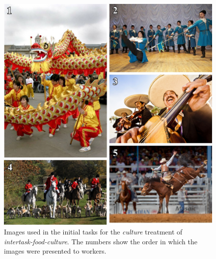 \documentclass[12pt]{article}
\begin{document}
\begin{figure}
	\begin{center}
	\includegraphics{figs/task2-cult.jpg}
	\end{center}
	\caption{
		Images used in the initial tasks for the
		\textit{culture} treatment of \textit{intertask-food-culture}.  
		The numbers show the order in which the 
		images were presented to workers.
	}
	\label{fig:task2:cult}
\end{figure}
\end{document}

